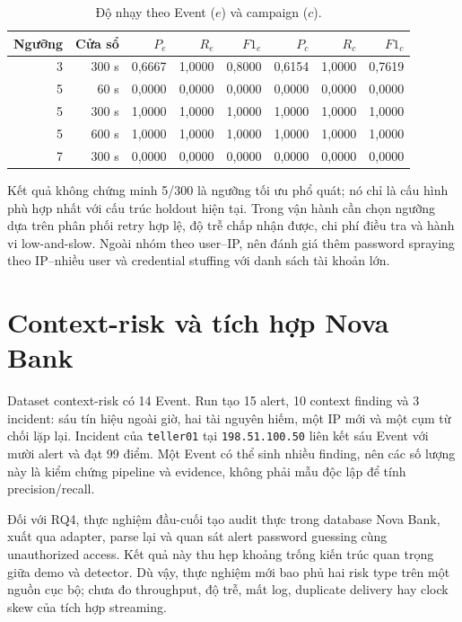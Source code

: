 \begin{table}[htbp]
\centering
\small
\begin{tabular}{rrrrrrrr}
\toprule
Ngưỡng & Cửa sổ & $P_e$ & $R_e$ & $F1_e$ & $P_c$ & $R_c$ & $F1_c$ \\
\midrule
3 & 300 s & 0,6667 & 1,0000 & 0,8000 & 0,6154 & 1,0000 & 0,7619 \\
5 & 60 s  & 0,0000 & 0,0000 & 0,0000 & 0,0000 & 0,0000 & 0,0000 \\
5 & 300 s & 1,0000 & 1,0000 & 1,0000 & 1,0000 & 1,0000 & 1,0000 \\
5 & 600 s & 1,0000 & 1,0000 & 1,0000 & 1,0000 & 1,0000 & 1,0000 \\
7 & 300 s & 0,0000 & 0,0000 & 0,0000 & 0,0000 & 0,0000 & 0,0000 \\
\bottomrule
\end{tabular}
\caption{Độ nhạy theo Event ($e$) và campaign ($c$).}
\label{tab:sensitivity}
\end{table}

Kết quả không chứng minh 5/300 là ngưỡng tối ưu phổ quát; nó chỉ là cấu hình
phù hợp nhất với cấu trúc holdout hiện tại. Trong vận hành cần chọn ngưỡng dựa
trên phân phối retry hợp lệ, độ trễ chấp nhận được, chi phí điều tra và hành vi
low-and-slow. Ngoài nhóm theo user--IP, nên đánh giá thêm password spraying
theo IP--nhiều user và credential stuffing với danh sách tài khoản lớn.

\section{Context-risk và tích hợp Nova Bank}

Dataset context-risk có 14 Event. Run tạo 15 alert, 10 context finding và 3
incident: sáu tín hiệu ngoài giờ, hai tài nguyên hiếm, một IP mới và một cụm
từ chối lặp lại. Incident của \texttt{teller01} tại
\texttt{198.51.100.50} liên kết sáu Event với mười alert và đạt 99 điểm. Một
Event có thể sinh nhiều finding, nên các số lượng này là kiểm chứng pipeline và
evidence, không phải mẫu độc lập để tính precision/recall.

Đối với RQ4, thực nghiệm đầu-cuối tạo audit thực trong database Nova Bank, xuất
qua adapter, parse lại và quan sát alert password guessing cùng unauthorized
access. Kết quả này thu hẹp khoảng trống kiến trúc quan trọng giữa demo và
detector. Dù vậy, thực nghiệm mới bao phủ hai risk type trên một nguồn cục bộ;
chưa đo throughput, độ trễ, mất log, duplicate delivery hay clock skew của tích
hợp streaming.

